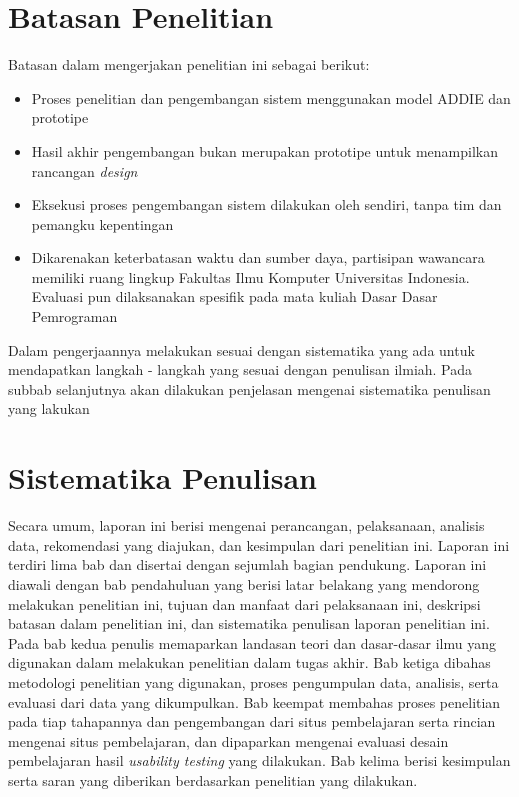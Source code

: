 \section{Batasan Penelitian}
Batasan dalam mengerjakan penelitian ini sebagai berikut:
\begin{itemize}
	\item Proses penelitian dan pengembangan sistem menggunakan model ADDIE dan prototipe
	\item Hasil akhir pengembangan bukan merupakan prototipe untuk menampilkan rancangan \textit{design}
	\item Eksekusi proses pengembangan sistem dilakukan oleh \saya sendiri, tanpa tim dan pemangku kepentingan
	\item Dikarenakan keterbatasan waktu dan sumber daya, partisipan wawancara memiliki ruang lingkup  Fakultas Ilmu Komputer Universitas Indonesia. Evaluasi pun dilaksanakan spesifik pada mata kuliah Dasar Dasar Pemrograman
\end{itemize}
Dalam pengerjaannya \saya melakukan sesuai dengan sistematika yang ada untuk mendapatkan langkah - langkah yang sesuai dengan penulisan ilmiah. Pada subbab selanjutnya akan dilakukan penjelasan mengenai sistematika penulisan yang lakukan
\section{Sistematika Penulisan}
Secara umum, laporan ini berisi mengenai perancangan, pelaksanaan, analisis data, rekomendasi yang diajukan, dan kesimpulan dari penelitian ini. Laporan ini terdiri lima bab dan disertai dengan sejumlah bagian pendukung. Laporan ini diawali dengan bab pendahuluan yang berisi latar belakang yang mendorong \saya melakukan penelitian ini, tujuan dan manfaat dari pelaksanaan ini, deskripsi batasan dalam penelitian ini, dan sistematika penulisan laporan penelitian ini. Pada bab kedua penulis memaparkan landasan teori dan dasar-dasar ilmu yang
digunakan dalam melakukan penelitian dalam tugas akhir. Bab ketiga dibahas
metodologi penelitian yang digunakan, proses pengumpulan data, analisis, serta
evaluasi dari data yang dikumpulkan. Bab keempat membahas proses penelitian
pada tiap tahapannya dan pengembangan dari situs pembelajaran serta rincian
mengenai situs pembelajaran, dan dipaparkan mengenai evaluasi desain pembelajaran hasil \textit{usability testing} yang dilakukan. Bab kelima berisi kesimpulan serta saran yang diberikan berdasarkan penelitian yang dilakukan.